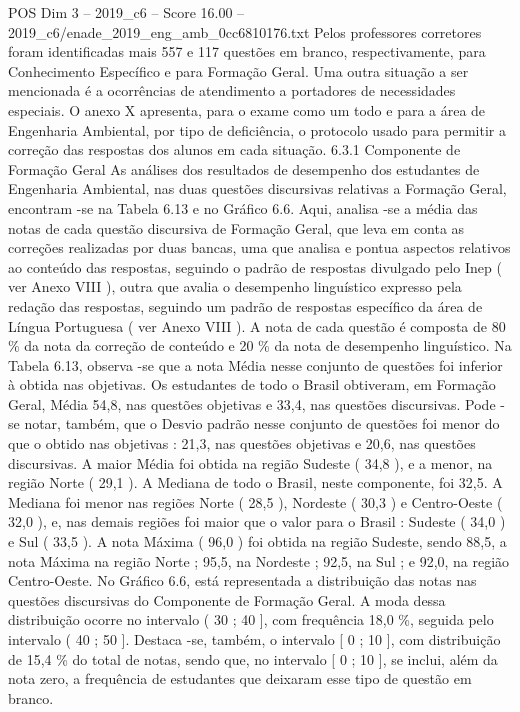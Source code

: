 \begin{textsample}{POS Dim 3 – 2019\_c6 – Score 16.00 – 2019\_c6/enade\_2019\_eng\_amb\_0cc6810176.txt}
Pelos professores corretores foram identificadas mais 557 e 117 questões em branco, respectivamente, para Conhecimento Específico e para Formação Geral.
Uma outra situação a ser mencionada é a ocorrências de atendimento a portadores de necessidades especiais.
O anexo X apresenta, para o exame como um todo e para a área de Engenharia Ambiental, por tipo de deficiência, o protocolo usado para permitir a correção das respostas dos alunos em cada situação. 6.3.1 Componente de Formação Geral As análises dos resultados de desempenho dos estudantes de Engenharia Ambiental, nas duas questões discursivas relativas a Formação Geral, encontram -se na Tabela 6.13 e no Gráfico 6.6.
Aqui, analisa -se a média das notas de cada questão discursiva de Formação Geral, que leva em conta as correções realizadas por duas bancas, uma que analisa e pontua aspectos relativos ao conteúdo das respostas, seguindo o padrão de respostas divulgado pelo Inep ( ver Anexo VIII ), outra que avalia o desempenho linguístico expresso pela redação das respostas, seguindo um padrão de respostas específico da área de Língua Portuguesa ( ver Anexo VIII ).
A nota de cada questão é composta de 80 \% da nota da correção de conteúdo e 20 \% da nota de desempenho linguístico.
Na Tabela 6.13, observa -se que a nota Média nesse conjunto de questões foi inferior à obtida nas objetivas.
Os estudantes de todo o Brasil obtiveram, em Formação Geral, Média 54,8, nas questões objetivas e 33,4, nas questões discursivas.
Pode -se notar, também, que o Desvio padrão nesse conjunto de questões foi menor do que o obtido nas objetivas : 21,3, nas questões objetivas e 20,6, nas questões discursivas.
A maior Média foi obtida na região Sudeste ( 34,8 ), e a menor, na região Norte ( 29,1 ).
A Mediana de todo o Brasil, neste componente, foi 32,5.
A Mediana foi menor nas regiões Norte ( 28,5 ), Nordeste ( 30,3 ) e Centro-Oeste ( 32,0 ), e, nas demais regiões foi maior que o valor para o Brasil : Sudeste ( 34,0 ) e Sul ( 33,5 ).
A nota Máxima ( 96,0 ) foi obtida na região Sudeste, sendo 88,5, a nota Máxima na região Norte ; 95,5, na Nordeste ; 92,5, na Sul ; e 92,0, na região Centro-Oeste.
No Gráfico 6.6, está representada a distribuição das notas nas questões discursivas do Componente de Formação Geral.
A moda dessa distribuição ocorre no intervalo ( 30 ; 40 ], com frequência 18,0 \%, seguida pelo intervalo ( 40 ; 50 ].
Destaca -se, também, o intervalo [ 0 ; 10 ], com distribuição de 15,4 \% do total de notas, sendo que, no intervalo [ 0 ; 10 ], se inclui, além da nota zero, a frequência de estudantes que deixaram esse tipo de questão em branco.

\end{textsample}
